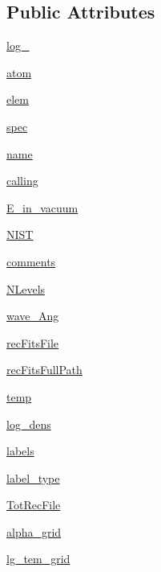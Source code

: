 \subsection*{Public Attributes}
\begin{DoxyCompactItemize}
\item 
\hyperlink{classpyneb_1_1core_1_1pynebcore_1_1_rec_atom_afd87151907f32bc0dc45f0171b61374e}{log\+\_\+}
\item 
\hyperlink{classpyneb_1_1core_1_1pynebcore_1_1_rec_atom_a0c5c7091b1d8a95d9bee2744d713f5c9}{atom}
\item 
\hyperlink{classpyneb_1_1core_1_1pynebcore_1_1_rec_atom_a62e73dc66c7aff7941c5ce94e808c23a}{elem}
\item 
\hyperlink{classpyneb_1_1core_1_1pynebcore_1_1_rec_atom_adaf1b66faf18504ec4b5c8c0b7f6763b}{spec}
\item 
\hyperlink{classpyneb_1_1core_1_1pynebcore_1_1_rec_atom_ab74e6bf80237ddc4109968cedc58c151}{name}
\item 
\hyperlink{classpyneb_1_1core_1_1pynebcore_1_1_rec_atom_ab25fa7ebe84b603684dee62410c1e34c}{calling}
\item 
\hyperlink{classpyneb_1_1core_1_1pynebcore_1_1_rec_atom_a9ebe0987aa5ded08c781ed3b5feb4d8a}{E\+\_\+in\+\_\+vacuum}
\item 
\hyperlink{classpyneb_1_1core_1_1pynebcore_1_1_rec_atom_a6d03226c81aa049b486e97a3462a794b}{N\+I\+S\+T}
\item 
\hyperlink{classpyneb_1_1core_1_1pynebcore_1_1_rec_atom_a64b8b36116751d566275b722e40bb3a7}{comments}
\item 
\hyperlink{classpyneb_1_1core_1_1pynebcore_1_1_rec_atom_a4d45fe163c2108853ab418386bf4da56}{N\+Levels}
\item 
\hyperlink{classpyneb_1_1core_1_1pynebcore_1_1_rec_atom_ab5130f33e76a12670614a4ecf47211b0}{wave\+\_\+\+Ang}
\item 
\hyperlink{classpyneb_1_1core_1_1pynebcore_1_1_rec_atom_a92b0b9192dc7e089ec88ea759e511ebf}{rec\+Fits\+File}
\item 
\hyperlink{classpyneb_1_1core_1_1pynebcore_1_1_rec_atom_ae146a26262d042f38fe497eb84e306af}{rec\+Fits\+Full\+Path}
\item 
\hyperlink{classpyneb_1_1core_1_1pynebcore_1_1_rec_atom_a905c521e05ec8042631a912b71d0454e}{temp}
\item 
\hyperlink{classpyneb_1_1core_1_1pynebcore_1_1_rec_atom_ad3a3ac99b890919687b848cfe0cb9fc0}{log\+\_\+dens}
\item 
\hyperlink{classpyneb_1_1core_1_1pynebcore_1_1_rec_atom_abc325fc13d4194905c1786e24ee447f0}{labels}
\item 
\hyperlink{classpyneb_1_1core_1_1pynebcore_1_1_rec_atom_a27a2d3d0fcd201122f8c13d604f91e38}{label\+\_\+type}
\item 
\hyperlink{classpyneb_1_1core_1_1pynebcore_1_1_rec_atom_a0fcbd7a04dbc3f296dd07465a41140bb}{Tot\+Rec\+File}
\item 
\hyperlink{classpyneb_1_1core_1_1pynebcore_1_1_rec_atom_aafd239b8375c7cfbdb8ed3bc8fc339d1}{alpha\+\_\+grid}
\item 
\hyperlink{classpyneb_1_1core_1_1pynebcore_1_1_rec_atom_a4c3755d724064b6fd92d0bdbd09b63a8}{lg\+\_\+tem\+\_\+grid}
\end{DoxyCompactItemize}


